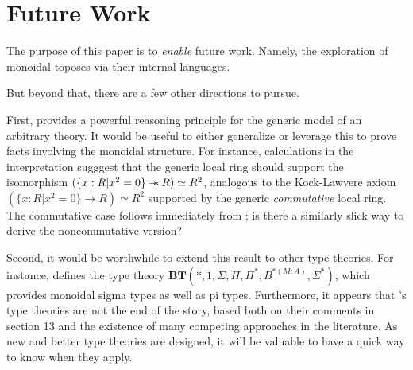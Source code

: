 \documentclass{article}
\newcommand*{\wand}{\mathbin{-\mkern-6mu*}}
\begin{document}
\section{Future Work}

The purpose of this paper is to \emph{enable} future work.
Namely, the exploration of monoidal toposes via their internal languages.

But beyond that, there are a few other directions to pursue.

First, \cite{blechschmidt} provides a powerful reasoning principle for the generic model of an arbitrary theory.
It would be useful to either generalize or leverage this to prove facts involving the monoidal structure.
For instance, calculations in the interpretation sugggest that the generic local ring should support
the isomorphism \((\{x : R | x^2 = 0\} \wand R) \simeq R^2\),
analogous to the Kock-Lawvere axiom \((\{x : R | x^2 = 0\} \to R) \simeq R^2\)
supported by the generic \emph{commutative} local ring.
The commutative case follows immediately from \cite[Theorem 4.10]{blechschmidt};
is there a similarly slick way to derive the noncommutative version?

Second, it would be worthwhile to extend this result to other type theories.
For instance, \cite{schopp} defines the type theory
\(\mathbf{BT}(*, 1, \Sigma, \Pi, \Pi^*, B^{*(M:A)}, \Sigma^*)\),
which provides monoidal sigma types as well as pi types.
Furthermore, it appears that \cite{schopp}'s type theories are not the end of the story,
based both on their comments in section 13 and the existence of many competing approaches in the literature.
As new and better type theories are designed, it will be valuable to have a quick way to know when they apply.

\printbibliography
\end{document}

